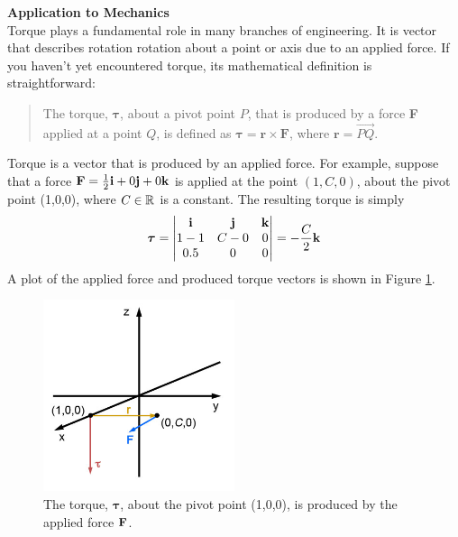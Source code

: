 \item \textbf{Application to Mechanics} \\
Torque plays a fundamental role in many branches of engineering. It is vector that describes rotation rotation about a point or axis due to an applied force. If you haven't yet encountered torque, its mathematical definition is straightforward:
\begin{quote}
The torque, $\boldsymbol\tau$, about a pivot point $P$, that is produced by a force \textbf{F} applied at a point $Q$, is defined as $\boldsymbol\tau = \mathbf{r} \times \mathbf{F}$, where $\mathbf{r}=\overrightarrow{PQ}$.
\end{quote}
Torque is a vector that is produced by an applied force. For example, suppose that a force $\mathbf{F}=\frac{1}{2}\mathbf{i} + 0\mathbf{j} + 0\mathbf{k}$ is applied at the point $(1,C,0)$, about the pivot point (1,0,0), where $C\in\mathbb{R}$ is a constant. The resulting torque is simply 
\begin{align*}
\boldsymbol\tau =   
\begin{vmatrix}
   \mathbf{i} &  \mathbf{j} &  \mathbf{k} \\
   1-1 &  C-0 &  0 \\
   0.5 & 0 &  0 \\
  \end{vmatrix}=-\frac{C}{2}\mathbf{k}
\end{align*} 
A plot of the applied force and produced torque vectors is shown in Figure \ref{FigTorque}.
\begin{figure}[H]
  \begin{center}
    \includegraphics[width=0.5\textwidth]{ImgTorqueExample.jpg}
          \caption{\small{The torque, $\boldsymbol\tau$, about the pivot point (1,0,0), is produced by the applied force $\mathbf{F}$.\label{FigTorque} }}
  \end{center}
\end{figure}

